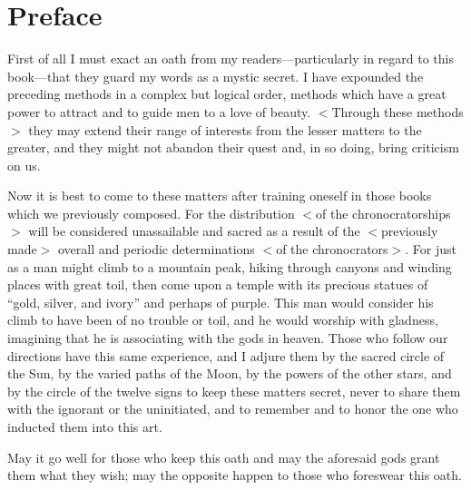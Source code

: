 \section{Preface}

First of all I must exact an oath from my readers—particularly in regard to this book—that they guard my words as a mystic secret. I have expounded the preceding methods in a complex but logical order,
methods which have a great power to attract and to guide men to a love of beauty. $<$Through these methods$>$ they may extend their range of interests from the lesser matters to the greater, and they might not abandon their quest and, in so doing, bring criticism on us. 

Now it is best to come to these matters after training oneself in those books which we previously composed. For the distribution $<$of the
chronocratorships$>$ will be considered unassailable and sacred as a result of the $<$previously made$>$ overall and periodic determinations $<$of the chronocrators$>$. For just as a man might climb to a mountain peak, hiking through canyons and winding places with great toil, then come upon a temple with its precious statues of “gold, silver, and ivory” and perhaps of purple. This man would consider his climb to have been of no trouble or toil, and he would worship with gladness, imagining that he is associating with the gods in heaven. Those who follow our directions have this same experience, and I adjure them by the sacred circle of the Sun, by the varied paths of the Moon, by the powers of the other stars, and by the circle of the
twelve signs to keep these matters secret, never to share them with the ignorant or the uninitiated, and to remember and to honor the one who inducted them into this art. 

May it go well for those who keep this oath and may the aforesaid gods grant them what they wish; may the opposite happen to those who foreswear this oath.

\newpage